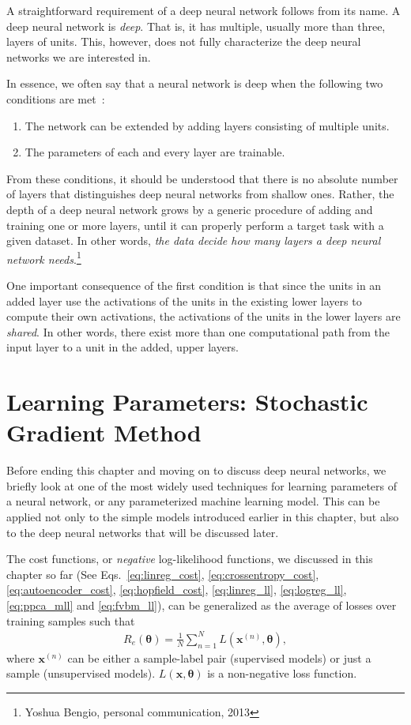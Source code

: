 \documentclass{now}
\newcommand{\vect}[1]{\mathbf{#1}}
\newcommand{\vects}[1]{\boldsymbol{#1}}
\newcommand{\vx}[0]{\vect{x}}
\newcommand{\TT}[0]{{\vects{\theta}}}
\begin{document}
A straightforward requirement of a deep neural network follows from its name. A
deep neural network is \textit{deep}. That is, it has multiple, usually more
than three, layers of units.  This, however, does not fully characterize the
deep neural networks we are interested in.

In essence, we often say that a neural network is deep when the following two
conditions are met~\citep[see, e.g.,][]{Bengio2007a}:
\begin{enumerate}
    \itemsep 0em
    \item The network can be extended by adding layers consisting of multiple units.
    \item The parameters of each and every layer are trainable.
\end{enumerate}

From these conditions, it should be understood that there is no absolute number
of layers that distinguishes deep neural networks from shallow ones. Rather, the
depth of a deep neural network grows by a generic procedure of adding and
training one or more layers, until it can properly perform a target task with a
given dataset. In other words, \textit{the data decide how many layers a deep
neural network needs}.\footnote{Yoshua Bengio, personal communication, 2013}

One important consequence of the first condition is that since the units in an
added layer use the activations of the units in the existing lower layers to
compute their own activations, the activations of the units in the lower layers
are \textit{shared}.  In other words, there exist more than one computational
path from the input layer to a unit in the added, upper layers.


\section{Learning Parameters: Stochastic Gradient Method}
\label{sec:stochastic_grad}

Before ending this chapter and moving on to discuss deep neural networks, we
briefly look at one of the most widely used techniques for learning parameters
of a neural network, or any parameterized machine learning model.  This can be
applied not only to the simple models introduced earlier in this chapter, but
also to the deep neural networks that will be discussed later.

The cost functions, or \textit{negative} log-likelihood functions, we discussed
in this chapter so far (See Eqs.~\eqref{eq:linreg_cost},
\eqref{eq:crossentropy_cost}, \eqref{eq:autoencoder_cost},
\eqref{eq:hopfield_cost}, \eqref{eq:linreg_ll}, \eqref{eq:logreg_ll},
\eqref{eq:ppca_mll} and \eqref{eq:fvbm_ll}), can be generalized as the average
of losses over training samples such that
\begin{align}
    \label{eq:slt_emp_cost}
    R_e(\TT) = \frac{1}{N} \sum_{n=1}^N L(\vx^{(n)}, \TT),
\end{align}
where $\vx^{(n)}$ can be either a sample-label pair (supervised models) or just
a sample (unsupervised models).  $L(\vx, \TT)$ is a non-negative loss function.
\end{document}
